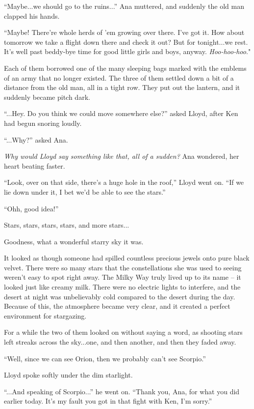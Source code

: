 \documentclass[
]{article}
\begin{document}
``Maybe...we should go to the ruins...'' Ana muttered, and suddenly the
old man clapped his hands.

``Maybe! There're whole herds of 'em growing over there. I've got it.
How about tomorrow we take a flight down there and check it out? But for
tonight...we rest. It's well past beddy-bye time for good little girls
and boys, anyway. \emph{Hoo-hoo-hoo}."

Each of them borrowed one of the many sleeping bags marked with the
emblems of an army that no longer existed. The three of them settled
down a bit of a distance from the old man, all in a tight row. They put
out the lantern, and it suddenly became pitch dark.

``...Hey. Do you think we could move somewhere else?'' asked Lloyd,
after Ken had begun snoring loudly.

``...Why?'' asked Ana.

\emph{Why would Lloyd say something like that, all of a sudden?} Ana
wondered, her heart beating faster.

``Look, over on that side, there's a huge hole in the roof,'' Lloyd went
on. ``If we lie down under it, I bet we'd be able to see the stars.''

``Ohh, good idea!''

Stars, stars, stars, stars, and more stars...

Goodness, what a wonderful starry sky it was.

It looked as though someone had spilled countless precious jewels onto
pure black velvet. There were so many stars that the constellations she
was used to seeing weren't easy to spot right away. The Milky Way truly
lived up to its name -- it looked just like creamy milk. There were no
electric lights to interfere, and the desert at night was unbelievably
cold compared to the desert during the day. Because of this, the
atmosphere became very clear, and it created a perfect environment for
stargazing.

For a while the two of them looked on without saying a word, as shooting
stars left streaks across the sky...one, and then another, and then they
faded away.

``Well, since we can see Orion, then we probably can't see Scorpio.''

Lloyd spoke softly under the dim starlight.

``...And speaking of Scorpio...'' he went on. ``Thank you, Ana, for what
you did earlier today. It's my fault you got in that fight with Ken, I'm
sorry.''
\end{document}
